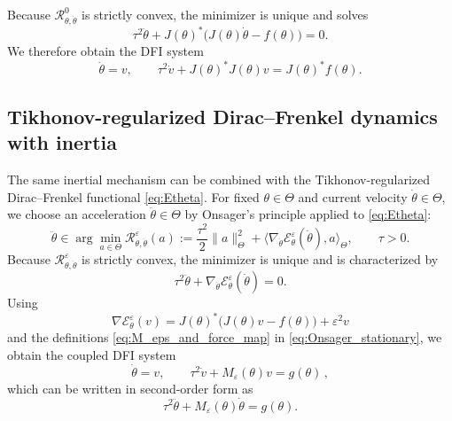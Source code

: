 \documentclass[oneside,11pt]{article}
\theoremstyle{remark}
\theoremstyle{thmstyleone}
\theoremstyle{thmstylethree}
\theoremstyle{thmstyletwo}
\newcommand{\ip}[2]{\langle #1,#2\rangle}
\newcommand{\norm}[1]{\lVert #1\rVert}
\newcommand{\mcE}{\mathcal{E}}
\newcommand{\mcR}{\mathcal{R}}
\begin{document}
 
 Because $\mcR^0_{\theta,\dot\theta}$ is strictly convex, the minimizer is unique and solves
        \begin{equation}
          \tau^2 \ddot \theta+J(\theta)^*\bigl(J(\theta)\dot\theta-f(\theta)\bigr)=0.
          \label{eq:Onsager_stationary_unreg}
        \end{equation}
   We therefore obtain the  DFI system
        \begin{equation}
          \dot\theta=v,
          \qquad
          \tau^2\dot v+J(\theta)^*J(\theta)v=J(\theta)^*f(\theta).
          \label{eq:continuous_sdfr_unreg}
        \end{equation}
  

\subsection{Tikhonov-regularized Dirac--Frenkel dynamics with inertia}
\label{sec:dfo_eps}
The same inertial mechanism can be combined with the Tikhonov-regularized Dirac--Frenkel functional \eqref{eq:Etheta}.
 For fixed $\theta\in \Theta$ and current velocity $\dot{\theta}\in \Theta$, we choose an acceleration $\ddot{\theta}\in \Theta$ by Onsager's principle applied to \eqref{eq:Etheta}:
        \begin{equation}
          \ddot{\theta} \in\arg\min_{a\in \Theta}\mcR^{\varepsilon}_{\theta,\dot{\theta}}(a):=\frac{\tau^2}{2}\norm{a}_\Theta^2+\ip{\nabla_{\dot{\theta}}\mcE_\theta^\varepsilon(\dot{\theta})}{a}_\Theta,
          \qquad \tau>0.
          \label{eq:Onsager_principle}
        \end{equation}
  Because $\mcR^{\varepsilon}_{\theta,\dot{\theta}}$ is strictly convex, the minimizer is unique and is characterized by
        \begin{equation}
          \tau^2 \ddot{\theta}+\nabla_{\dot{\theta}}\mcE_\theta^\varepsilon(\dot{\theta})=0.
          \label{eq:Onsager_stationary}
        \end{equation}
 Using
        \begin{equation}
          \nabla\mcE_\theta^\varepsilon(v)=J(\theta)^*\bigl(J(\theta)v-f(\theta)\bigr)+\varepsilon^2 v
          \label{eq:gradEtheta}
        \end{equation}
        and the definitions  \eqref{eq:M_eps_and_force_map} in \eqref{eq:Onsager_stationary}, we obtain the coupled DFI system
        \begin{equation}
          \dot\theta=v,
          \qquad
          \tau^2\dot v+M_{\varepsilon}(\theta) v=g(\theta)\,,
          \label{eq:continuous_dfo}
        \end{equation}
  which can be written in second-order form as 
        \begin{equation}
          \tau^2\ddot\theta+M_{\varepsilon}(\theta)\dot\theta
          =g(\theta).
          \label{eq:continuous_dfo_second_order}
        \end{equation}
 
\end{document}
